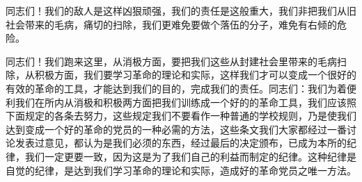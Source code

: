 同志们！我们的敌人是这样凶狠顽强，我们的责任是这般重大，我们非把我们从旧社会带来的毛病，痛切的扫除，我们更难免要做个落伍的分子，难免有右倾的危险。

同志们！我们跑来这里，从消极方面，要把我们这些从封建社会里带来的毛病扫除，从积极方面，我们要学习革命的理论和实际，这样我们才可以变成一个很好的有效的革命的工具，才能达到我们的目的，完成我们的责任。同志们：我们为着便利我们在所内从消极和积极两方面把我们训练成一个好的的革命工具，我们应该照下面规定的各条去努力，这些规定我们不要看作一种普通的学校规则，乃是使我们达到变成一个好的革命的党员的一种必需的方法，这些条文我们大家都经过一番讨论发表过意见，都认为是我们必须的东西，经过最后的决定颁布，已成为本所的纪律，我们一定更要一致，因为这是为了我们自己的利益而制定的纪律。这种纪律是自觉的纪律，是达到我们学习革命的理论和实际，造成好的革命党员之唯一方法。

